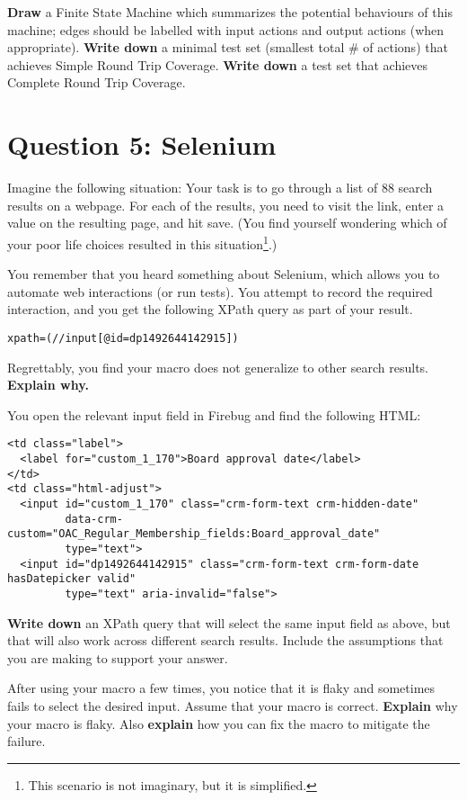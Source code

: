 \documentclass[12pt]{article}
\begin{document}
{\bf Draw} a Finite State Machine which summarizes the potential behaviours
of this machine; edges should be labelled with input actions and
output actions (when appropriate). {\bf Write down} a minimal test set (smallest total \# of actions) that achieves
Simple Round Trip Coverage. {\bf Write down} a test set that achieves
Complete Round Trip Coverage.

\section*{Question 5: Selenium}
Imagine the following situation: Your task is to go through a list of
88 search results on a webpage. For each of the results, you need to
visit the link, enter a value on the resulting page, and hit save. (You find yourself
wondering which of your poor life choices resulted in this
situation\footnote{This scenario is not imaginary, but it is simplified.}.)

You remember that you heard something about Selenium, which allows you
to automate web interactions (or run tests). You attempt to record the
required interaction, and you get the following XPath query as part of your result.

\begin{center}
  \verb+xpath=(//input[@id=dp1492644142915])+
\end{center}

Regrettably, you find your macro does not generalize to other search
results. {\bf Explain why.}

You open the relevant input field in Firebug and find the following HTML:
\begin{lstlisting}
<td class="label">
  <label for="custom_1_170">Board approval date</label>
</td>
<td class="html-adjust">
  <input id="custom_1_170" class="crm-form-text crm-hidden-date"
         data-crm-custom="OAC_Regular_Membership_fields:Board_approval_date"
         type="text">
  <input id="dp1492644142915" class="crm-form-text crm-form-date hasDatepicker valid"
         type="text" aria-invalid="false">
\end{lstlisting}
{\bf Write down} an XPath query that will select the same input field as above, but that will
also work across different search results. Include the assumptions that you are making to
support your answer.

After using your macro a few times, you notice that it is flaky and
sometimes fails to select the desired input. Assume that your macro is correct.
{\bf Explain} why your macro is flaky. Also {\bf explain} how you can fix the macro to mitigate the failure.
\end{document}
